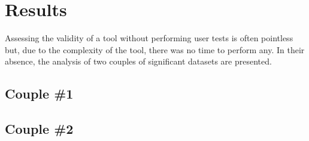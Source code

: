\chapter{Results}

Assessing the validity of a tool without performing user tests is often pointless but, due to the complexity of the tool, there was no time to perform any. In their absence, the analysis of two couples of significant datasets are presented.

\section{Couple \#1}

\section{Couple \#2}


